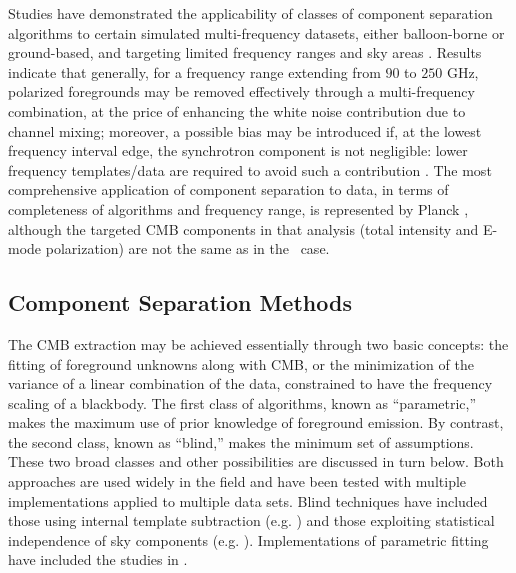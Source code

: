 Studies have demonstrated the applicability of classes of component separation 
algorithms to certain simulated multi-frequency datasets, either balloon-borne or ground-based, and targeting limited frequency ranges and sky areas \cite{Stivoli:2010rs,Fantaye:2011zq,Fantaye:2012ha}. Results indicate that generally, for a frequency range extending from $90$ to $250$ GHz, polarized foregrounds may be removed effectively through a multi-frequency combination, at the price of enhancing the white noise contribution due to channel mixing; moreover, a possible bias may be introduced if, at the lowest frequency interval edge, the synchrotron component is not negligible: lower frequency templates/data are required to avoid such a contribution \cite{Essinger-Hileman:2014pja}. 
The most comprehensive application of component separation to data, in terms of completeness of algorithms and frequency range, is represented by Planck \cite{Adam:2015tpy}, 
although the targeted CMB components in that analysis (total intensity and E-mode polarization) are
not the same as in the \cmbexp\ case.

\subsection{Component Separation Methods}

The CMB extraction may be achieved essentially through two basic concepts: the fitting of foreground unknowns along with CMB, or the minimization of the variance of a linear combination of the data, constrained to have the frequency scaling of a blackbody.
The first class of algorithms, known as ``parametric,'' makes the maximum use of prior knowledge of foreground emission. By contrast, the second class, known as ``blind,'' makes the minimum set of assumptions. 
These two broad classes and other possibilities are discussed in turn below.
Both approaches are used widely in the field and have been tested with multiple implementations applied
to multiple data sets. Blind techniques have included those using internal template subtraction (e.g. \cite{Bennett:1992aa,Hansen:2006rj,Katayama:2011eh}) and those exploiting statistical independence of sky components (e.g. \cite{Delabrouille:2002kz,Maino:2006pq,Bonaldi:2006qw,Stolyarov:2004xp}). Implementations of parametric fitting have included the studies in \cite{Brandt:1994aa,Eriksen:2005dr, Stompor:2008sf}.


